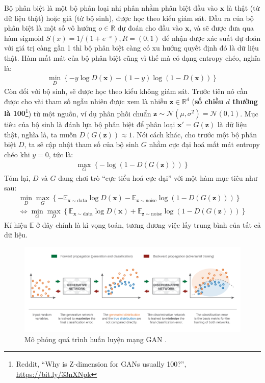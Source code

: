 \documentclass[a4paper, 12pt]{article}
\begin{document}
\noindent
Bộ phân biệt là một bộ phân loại nhị phân nhằm phân biệt đầu vào $\mathbf{x}$ là thật (từ dữ liệu thật) hoặc giả (từ bộ sinh), được học theo kiểu giám sát. Đầu ra của bộ phân biệt là một số vô hướng $o \in \mathbb{R}$ dự đoán cho đầu vào $\mathbf{x}$, và sẽ được đưa qua hàm sigmoid $S(x) = 1/(1+e^{-x}), R = (0, 1)$ để nhận được xác suất dự đoán với giá trị càng gần 1 thì bộ phân biệt càng có xu hướng quyết định đó là dữ liệu thật. Hàm mất mát của bộ phân biệt cũng vì thế mà có dạng entropy chéo, nghĩa là:
\begin{align*}
    \min_{D}\left\{-y\log D\left(\mathbf{x}\right) - \left(1-y\right)\log\left(1-D\left(\mathbf{x}\right)\right)\right\}
\end{align*}
Còn đối với bộ sinh, sẽ được học theo kiểu không giám sát. Trước tiên nó cần được cho vài tham số ngẫu nhiên được xem là nhiễu $\mathbf{z} \in \mathbb{R}^d$ (\textbf{số chiều $d$ thường là 100}\footnote{Reddit, ``Why is Z-dimension for GANs usually 100?'', \href{https://bit.ly/33nXNpk}{https://bit.ly/33nXNpk}}) từ một nguồn, ví dụ phân phối chuẩn $\mathbf{z} \sim \mathcal{N}\left(\mu, \sigma^2\right)=\mathcal{N}\left(0, 1\right)$. Mục tiêu của bộ sinh là đánh lựa bộ phân biệt để phân loại $\mathbf{x'} = G\left(\mathbf{z}\right)$ là dữ liệu thật, nghĩa là, ta muốn $D\left(G\left(\mathbf{z}\right)\right) \approx 1$. Nói cách khác, cho trước một bộ phân biệt $D$, ta sẽ cập nhật tham số của bộ sinh $G$ nhằm cực đại hoá mất mát entropy chéo khi $y=0$, tức là:
\begin{align*}
    \max_G\left\{-\log\left(1-D\left(G\left(\mathbf{z}\right)\right)\right)\right\}
\end{align*}
Tóm lại, $D$ và $G$ đang chơi trò ``cực tiểu hoá cực đại'' với một hàm mục tiêu như sau:
\begin{align*}
    \min_D\max_G\left\{-\mathbb{E}_{\mathbf{x}\sim \text{data}}\log D\left(\mathbf{x}\right)-\mathbb{E}_{\mathbf{z} \sim \text{noise}}\log\left(1-D\left(G\left(\mathbf{z}\right)\right)\right)\right\}\\
    \Leftrightarrow \min_G\max_D\left\{\mathbb{E}_{\mathbf{x}\sim \text{data}}\log D\left(\mathbf{x}\right)+\mathbb{E}_{\mathbf{z} \sim \text{noise}}\log\left(1-D\left(G\left(\mathbf{z}\right)\right)\right)\right\}
\end{align*}
Kí hiệu $\mathbb{E}$ ở đây chính là kì vọng toán, tương đương việc lấy trung bình của tất cả dữ liệu.

\begin{figure}[!h]
\captionsetup{width=0.8\textwidth}
\centering
\includegraphics[width=16.5cm]{images/2_72.png}
\caption{Mô phỏng quá trình huấn luyện mạng GAN \cite{josephgan2019}.}
\label{fig:forandbackgan}
\end{figure}
\end{document}
